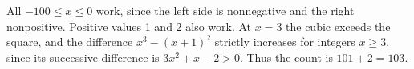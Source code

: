 All $-100\le x\le0$ work, since the left side is nonnegative and the right nonpositive. Positive values 1 and 2 also work. At $x=3$ the cubic exceeds the square, and the difference $x^3-(x+1)^2$ strictly increases for integers $x\ge3$, since its successive difference is $3x^2+x-2>0$. Thus the count is $101+2=\boxed{103}$.
